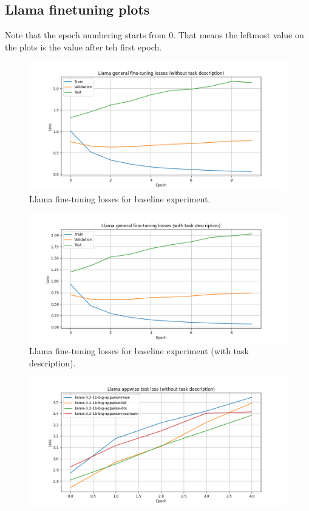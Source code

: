 \documentclass[licencjacka,en]{pracamgr}
\begin{document}
\begin{appendices}
\chapter{Llama finetuning plots} \label{AppH}
Note that the epoch numbering starts from 0. That means the leftmost value on the plots is the value after teh first epoch.
\begin{figure}[h]
    \centering
    \includegraphics[width=0.8\linewidth]{bachelor_images/llama_ft/llama-wth-loss.png}
    \caption{Llama fine-tuning losses for baseline experiment.}
    \label{fig:llama-wth-loss}
\end{figure}
\begin{figure}[h]
    \centering
    \includegraphics[width=0.8\linewidth]{bachelor_images/llama_ft/llama-w-loss.png}
    \caption{Llama fine-tuning losses for baseline experiment (with task description).}
    \label{fig:llama-w-loss}
\end{figure}
\begin{figure}[h]
    \centering
    \includegraphics[width=0.8\linewidth]{bachelor_images/llama_ft/llama-appwise-wth-test.png}

\end{figure}
\end{appendices}
\end{document}
